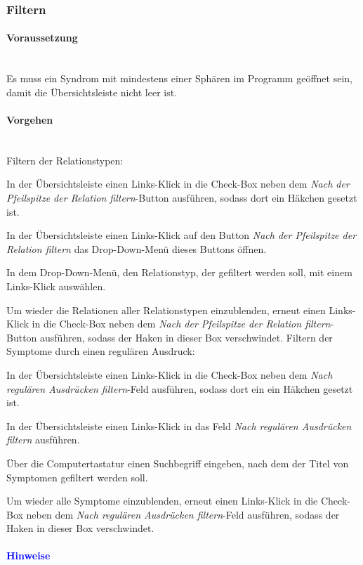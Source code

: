 \documentclass[enabledeprecatedfontcommands,fontsize=11pt,paper=a4,twoside]{scrartcl}
\newcommand*{\bbe}{\textcolor{bbe}}
\newcounter{one}
\newcommand*{\hint}{\paragraph{\textcolor{blue}{Hinweise}}}
\newcommand*{\condition}{\paragraph{Voraussetzung}$\;$ \vspace{0.2cm}\\}
\newcommand*{\actions}{\paragraph{Vorgehen} $\;$\vspace{0.2cm}\\}
\let\origenumerate\enumerate
\let\origendenumerate\endenumerate
\renewenvironment{enumerate}{\origenumerate \addtolength{\itemsep}{-10.0pt}}{\origendenumerate}
\begin{document}
\subsubsection{Filtern}
	\condition
	Es muss ein Syndrom mit mindestens einer Sphären im Programm geöffnet sein, damit die Übersichtsleiste nicht leer ist. 
	\actions
	\bbe{Filtern der Relationstypen:}
	\begin{enumerate}
		\item In der Übersichtsleiste einen Links-Klick in die Check-Box neben dem \textit{Nach der Pfeilspitze der Relation filtern}-Button ausführen, sodass dort ein Häkchen gesetzt ist.
		\item In der Übersichtsleiste einen Links-Klick auf den Button \textit{Nach der Pfeilspitze der Relation filtern} das Drop-Down-Menü dieses Buttons öffnen.
		\item In dem Drop-Down-Menü, den Relationstyp, der gefiltert werden soll, mit einem Links-Klick auswählen.
		\item Um wieder die Relationen aller Relationstypen einzublenden, erneut einen Links-Klick in die Check-Box neben dem \textit{Nach der Pfeilspitze der Relation filtern}-Button ausführen, sodass der Haken in dieser Box verschwindet.
	\end{enumerate}
	\bbe{Filtern der Symptome durch einen regulären Ausdruck:}
		\begin{enumerate}
		\item In der Übersichtsleiste einen Links-Klick in die Check-Box neben dem \textit{Nach regulären Ausdrücken filtern}-Feld ausführen, sodass dort ein ein Häkchen gesetzt ist.
		\item In der Übersichtsleiste einen Links-Klick in das Feld \textit{Nach regulären Ausdrücken filtern} ausführen.
		\item Über die Computertastatur einen Suchbegriff eingeben, nach dem der Titel von Symptomen gefiltert werden soll. 
		\item Um wieder alle Symptome einzublenden, erneut einen Links-Klick in die Check-Box neben dem \textit{Nach regulären Ausdrücken filtern}-Feld ausführen, sodass der Haken in dieser Box verschwindet.
		\end{enumerate}
	\hint
\end{document}
